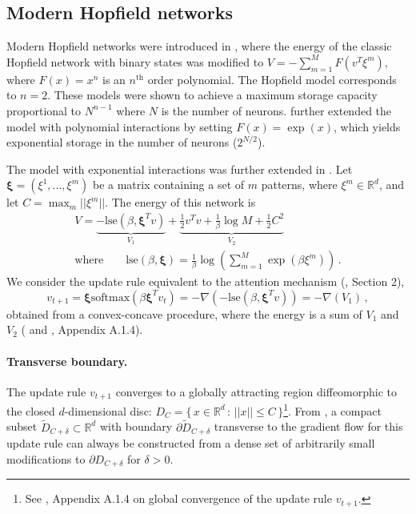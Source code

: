 \documentclass[12pt]{article}
\begin{document}
\subsection{Modern Hopfield networks}
\label{subsection:applications-modern-hopfield-networks}
Modern Hopfield networks were introduced in \cite{krotov2016dense}, where the energy of the classic Hopfield network with binary states was modified to $V = - \sum_{m=1}^{M} F(v^T \xi^m)$, where $F(x) = x^n$ is an $n^{\text{th}}$ order polynomial. The Hopfield model corresponds to $n=2$. These models were shown to achieve a maximum storage capacity proportional to $N^{n-1}$ where $N$ is the number of neurons. \cite{demircigil2017model} further extended the model with polynomial interactions by setting $F(x) = \exp(x)$, which yields exponential storage in the number of neurons ($2^{N/2}$).

The model with exponential interactions was further extended in \cite{ramsauer2020hopfield}. Let $\bm{\xi} = (\xi^1,..., \xi^m)$ be a matrix containing a set of $m$ patterns, where $\xi^m \in \mathbb{R}^d$, and let $C = \max_m || \xi^m ||$. The energy of this network is
\begin{gather*}
    V = \underbrace{-\text{lse}(\beta,\bm{\xi}^Tv)}_{V_1} + \underbrace{\frac{1}{2}v^Tv + \frac{1}{\beta} \log M+ \frac{1}{2} C^2}_{V_2} \\
    \mathrm{where } \qquad \text{lse}(\beta,\bm{\xi}) = \frac{1}{\beta}\log \left( \sum_{m=1}^M \exp (\beta \xi^m)\right) \, .
\end{gather*}
We consider the update rule equivalent to the attention mechanism (\cite{ramsauer2020hopfield}, Section 2),
\begin{equation*}
    v_{t+1} = \bm{\xi}\text{softmax}\left(  \beta \bm{\xi}^T v_t\right) = - \nabla \left( -\text{lse}(\beta,\bm{\xi}^Tv) \right) = -\nabla (V_1) \, ,
\end{equation*}
obtained from a convex-concave procedure, where the energy is a sum of $V_1$ and $V_2$ (\cite{yuille2001concave} and \cite{ramsauer2020hopfield}, Appendix A.1.4).

\paragraph{Transverse boundary.} The update rule $v_{t+1}$ converges to a globally attracting region diffeomorphic to the closed $d$-dimensional disc: $D_C = \{\,x\in \mathbb{R}^d \, : \, ||x|| \leq C \,\}$\footnote{See \cite{ramsauer2020hopfield}, Appendix A.1.4 on global convergence of the update rule $v_{t+1}$.}. From , a compact subset $\tilde{D}_{C+\delta} \subset \mathbb{R}^d$ with boundary $\partial \tilde{D}_{C+\delta}$ transverse to the gradient flow for this update rule can always be constructed from a dense set of arbitrarily small modifications to $\partial D_{C+\delta}$ for $\delta > 0$. 
\end{document}
